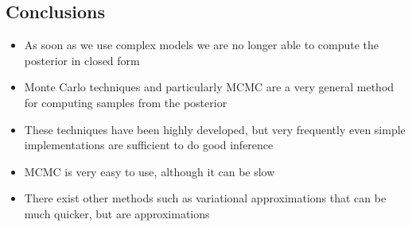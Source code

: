 
\begin{slide}
\section{Conclusions}

\begin{PauseHighLight}
  \begin{itemize}
  \item As soon as we use complex models we are no longer able to
    compute the posterior in closed form\pause
  \item Monte Carlo techniques and particularly MCMC are a very general
    method for computing samples from the posterior\pause
  \item These techniques have been highly developed, but very frequently
    even simple implementations are sufficient to do good
    inference\pause
  \item MCMC is very easy to use, although it can be slow\pause
  \item There exist other methods such as variational approximations
    that can be much quicker, but are approximations\pause
  \end{itemize}
\end{PauseHighLight}

\end{slide}

